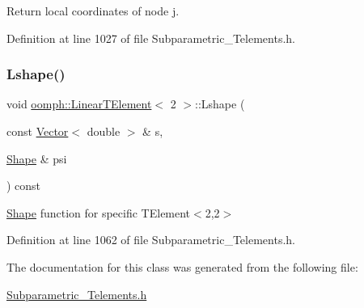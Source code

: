 Return local coordinates of node j. 



Definition at line 1027 of file Subparametric\+\_\+\+Telements.\+h.

\mbox{\label{classoomph_1_1LinearTElement_3_012_01_4_ab20729d302959a5d81e0dfa8b3f4b9e5}} 
\subsubsection{\texorpdfstring{Lshape()}{Lshape()}}
{\footnotesize\ttfamily void \hyperlink{classoomph_1_1LinearTElement}{oomph\+::\+Linear\+T\+Element}$<$ 2 $>$\+::Lshape (\begin{DoxyParamCaption}\item[{const \hyperlink{classoomph_1_1Vector}{Vector}$<$ double $>$ \&}]{s,  }\item[{\hyperlink{classoomph_1_1Shape}{Shape} \&}]{psi }\end{DoxyParamCaption}) const\hspace{0.3cm}{\ttfamily [inline]}}



\hyperlink{classoomph_1_1Shape}{Shape} function for specific T\+Element$<$2,2$>$ 



Definition at line 1062 of file Subparametric\+\_\+\+Telements.\+h.



The documentation for this class was generated from the following file\+:\begin{DoxyCompactItemize}
\item 
\hyperlink{Subparametric__Telements_8h}{Subparametric\+\_\+\+Telements.\+h}\end{DoxyCompactItemize}
